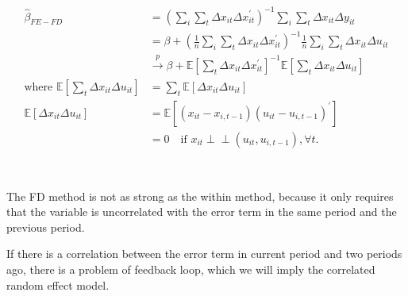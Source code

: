 \begin{align*}
    \hat{\beta}_{FE-FD} &= \left(\sum_i \sum_t \Delta x_{it} \Delta x_{it}^{\prime} \right)^{-1} \sum_i \sum_t \Delta x_{it} \Delta y_{it} \\
    &= \beta + \left(\frac{1}{n} \sum_i \sum_t \Delta x_{it} \Delta x_{it}^{\prime} \right)^{-1} \frac{1}{n} \sum_i \sum_t \Delta x_{it} \Delta u_{it} \\
    &\overset{p}{\rightarrow} \beta + \mathbb{E}\left[\sum_t \Delta x_{it} \Delta x_{it}^{\prime} \right]^{-1} \mathbb{E}\left[\sum_t \Delta x_{it} \Delta u_{it} \right] \\
    \text{where } \mathbb{E}\left[\sum_t \Delta x_{it} \Delta u_{it}\right] &= \sum_t \mathbb{E}\left[\Delta x_{it} \Delta u_{it} \right]\\
    \mathbb{E}\left[\Delta x_{it} \Delta u_{it} \right] &= \mathbb{E}\left[\left(x_{it} - x_{i, t-1} \right) \left(u_{it} - u_{i, t-1} \right)^{\prime} \right] \\
    &= 0 \quad \text{if } x_{it} \perp\!\!\!\perp (u_{it}, u_{i, t-1}), \forall t.
\end{align*}

\begin{note}
    \

    The FD method is not as strong as the within method, because it only requires that the variable is
    uncorrelated with the error term in the same period and the previous period.

    If there is a correlation between the error term in current period and two periods ago, there is a problem of feedback loop,
    which we will imply the correlated random effect model.
\end{note}
